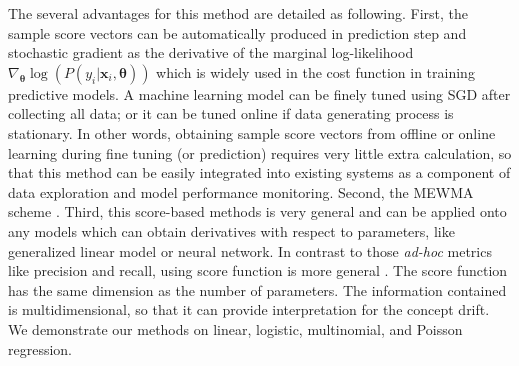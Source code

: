 \documentclass[twoside,11pt]{article}
\begin{document}
The several advantages for this method are detailed as following. First, the sample score vectors can be automatically produced in prediction step and stochastic gradient  as the derivative of the marginal log-likelihood {$\nabla _{\bm { \theta}} \log(P (y_i|\bm {x}_i, \bm { \theta}))$} which is widely used in the cost function in training predictive models. A machine learning model can be finely tuned using SGD after collecting all data; or it can be tuned online if data generating process is stationary. In other words, obtaining sample score vectors from offline or online learning during fine tuning (or prediction) requires very little extra calculation, so that this method can be easily integrated into existing systems as a component of data exploration and model performance monitoring. Second, the MEWMA scheme . Third, this score-based methods is very general and can be applied onto any models which can obtain derivatives with respect to parameters, like generalized linear model or neural network. In contrast to those \textit{ad-hoc}  metrics like precision and recall, using score function is more general . The score function has the same dimension as the number of parameters. The information contained is multidimensional, so that it can provide interpretation for the concept drift. We demonstrate our methods on linear, logistic, multinomial, and Poisson regression.
\end{document}
